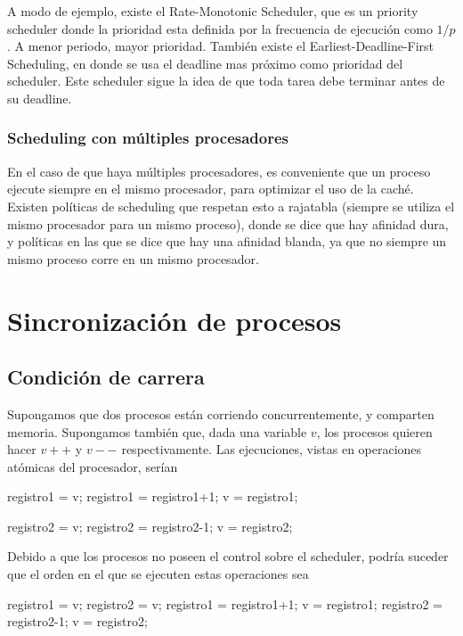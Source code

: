 \documentclass{article}
\begin{document}
A modo de ejemplo, existe el Rate-Monotonic Scheduler, que es un priority scheduler donde la prioridad esta definida por la frecuencia de ejecución como $1/p$. A menor periodo, mayor prioridad. También existe el Earliest-Deadline-First Scheduling, en donde se usa el deadline mas próximo como prioridad del scheduler. Este scheduler sigue la idea de que toda tarea debe terminar antes de su deadline.

\subsubsection{Scheduling con m\'ultiples procesadores}

En el caso de que haya m\'ultiples procesadores, es conveniente que un proceso ejecute siempre en el mismo procesador, para optimizar el uso de la cach\'e. Existen pol\'iticas de scheduling que respetan esto a rajatabla (siempre se utiliza el mismo procesador para un mismo proceso), donde se dice que hay afinidad dura, y pol\'iticas en las que se dice que hay una afinidad blanda, ya que no siempre un mismo proceso corre en un mismo procesador.

\section{Sincronizaci\'on de procesos}

\subsection{Condici\'on de carrera}

Supongamos que dos procesos est\'an corriendo concurrentemente, y comparten memoria. Supongamos tambi\'en que, dada una variable $v$, los procesos quieren hacer $v++$ y $v--$ respectivamente. Las ejecuciones, vistas en operaciones at\'omicas del procesador, ser\'ian

\begin{code}
registro1 = v;
registro1 = registro1+1;
v = registro1;
\end{code}

\begin{code}
registro2 = v;
registro2 = registro2-1;
v = registro2;
\end{code}

Debido a que los procesos no poseen el control sobre el scheduler, podr\'ia suceder que el orden en el que se ejecuten estas operaciones sea

\begin{code}
registro1 = v;
registro2 = v;
registro1 = registro1+1;
v = registro1;
registro2 = registro2-1;
v = registro2;
\end{code}
\end{document}
